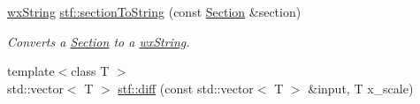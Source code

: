 \begin{DoxyCompactItemize}
\hyperlink{classwxString}{wxString} \hyperlink{group__stfgen_ga9536c899dc7a569c55ba8957aec43613}{stf::sectionToString} (const \hyperlink{classSection}{Section} \&section)
\begin{DoxyCompactList}\small\item\em Converts a \hyperlink{classSection}{Section} to a \hyperlink{classwxString}{wxString}. \item\end{DoxyCompactList}\item 
\hypertarget{group__stfgen_ga3892c35dfb30e27bdc9f6e178ebf064e}{
{\footnotesize template$<$class T $>$ }\\std::vector$<$ T $>$ \hyperlink{group__stfgen_ga3892c35dfb30e27bdc9f6e178ebf064e}{stf::diff} (const std::vector$<$ T $>$ \&input, T x\_\-scale)}
\label{group__stfgen_ga3892c35dfb30e27bdc9f6e178ebf064e}


\end{DoxyCompactItemize}
